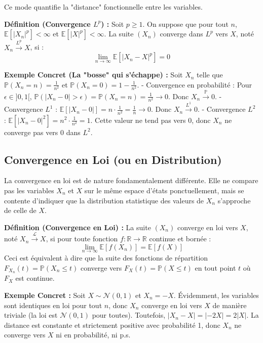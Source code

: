 \documentclass[11pt,a4paper]{article}
\begin{document}
Ce mode quantifie la "distance" fonctionnelle entre les variables.

\textbf{Définition (Convergence $L^p$) :}
Soit $p \ge 1$. On suppose que pour tout $n$, $\mathbb{E}[|X_n|^p] < \infty$ et $\mathbb{E}[|X|^p] < \infty$. La suite $(X_n)$ converge dans $L^p$ vers $X$, noté $X_n \xrightarrow{L^p} X$, si :
$$ \lim_{n \to \infty} \mathbb{E}[|X_n - X|^p] = 0 $$

\textbf{Exemple Concret (La "bosse" qui s'échappe) :}
Soit $X_n$ telle que $\mathbb{P}(X_n = n) = \frac{1}{n^2}$ et $\mathbb{P}(X_n = 0) = 1 - \frac{1}{n^2}$.
- Convergence en probabilité : Pour $\epsilon \in ]0, 1[$, $\mathbb{P}(|X_n - 0| > \epsilon) = \mathbb{P}(X_n = n) = \frac{1}{n^2} \to 0$. Donc $X_n \xrightarrow{\mathbb{P}} 0$.
- Convergence $L^1$ : $\mathbb{E}[|X_n - 0|] = n \cdot \frac{1}{n^2} = \frac{1}{n} \to 0$. Donc $X_n \xrightarrow{L^1} 0$.
- Convergence $L^2$ : $\mathbb{E}[|X_n - 0|^2] = n^2 \cdot \frac{1}{n^2} = 1$. Cette valeur ne tend pas vers $0$, donc $X_n$ ne converge pas vers $0$ dans $L^2$.

\subsection{Convergence en Loi (ou en Distribution)}

La convergence en loi est de nature fondamentalement différente. Elle ne compare pas les variables $X_n$ et $X$ sur le même espace d'états ponctuellement, mais se contente d'indiquer que la distribution statistique des valeurs de $X_n$ s'approche de celle de $X$.

\textbf{Définition (Convergence en Loi) :}
La suite $(X_n)$ converge en loi vers $X$, noté $X_n \xrightarrow{\mathcal{L}} X$, si pour toute fonction $f : \mathbb{R} \to \mathbb{R}$ continue et bornée :
$$ \lim_{n \to \infty} \mathbb{E}[f(X_n)] = \mathbb{E}[f(X)] $$
Ceci est équivalent à dire que la suite des fonctions de répartition $F_{X_n}(t) = \mathbb{P}(X_n \le t)$ converge vers $F_X(t) = \mathbb{P}(X \le t)$ en tout point $t$ où $F_X$ est continue.

\textbf{Exemple Concret :}
Soit $X \sim \mathcal{N}(0, 1)$ et $X_n = -X$. Évidemment, les variables sont identiques en loi pour tout $n$, donc $X_n$ converge en loi vers $X$ de manière triviale (la loi est $\mathcal{N}(0, 1)$ pour toutes).
Toutefois, $|X_n - X| = |-2X| = 2|X|$. La distance est constante et strictement positive avec probabilité 1, donc $X_n$ ne converge vers $X$ ni en probabilité, ni p.s.
\end{document}
